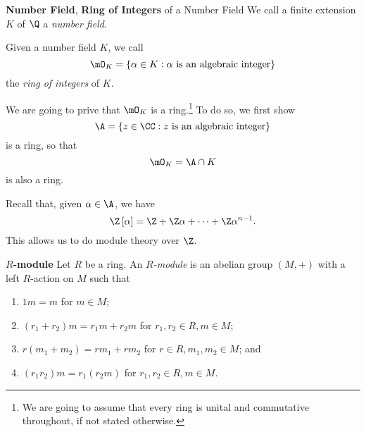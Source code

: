\documentclass[pmath441]{subfiles}
\begin{document}
    \begin{definition}{\textbf{Number Field}, \textbf{Ring of Integers} of a Number Field}
        We call a finite extension $K$ of $\Q$ a \emph{number field}.

        Given a number field $K$, we call
        \begin{equation*}
            \mO_K = \left\lbrace \alpha\in K: \alpha \text{ is an algebraic integer} \right\rbrace
        \end{equation*}
        the \emph{ring of integers} of $K$.
    \end{definition}
    
    \np We are going to prive that $\mO_K$ is a ring.\footnote{We are going to assume that every ring is unital and commutative throughout, if not stated otherwise.} To do so, we first show
    \begin{equation*}
        \A = \left\lbrace z\in\CC: z\text{ is an algebraic integer} \right\rbrace
    \end{equation*}
    is a ring, so that
    \begin{equation*}
        \mO_K = \A\cap K
    \end{equation*}
    is also a ring.
    
    \np Recall that, given $\alpha\in\A$, we have
    \begin{equation*}
        \Z\left[ \alpha \right] = \Z + \Z\alpha + \cdots + \Z\alpha^{n-1}.
    \end{equation*}
    This allows us to do module theory over $\Z$.

    \begin{definition}{\textbf{$R$-module}}
        Let $R$ be a ring. An \emph{$R$-module} is an abelian group $\left( M,+ \right)$ with a left $R$-action on $M$ such that
        \begin{enumerate}
            \item $1m = m$ for $m\in M$;
            \item $\left( r_1+r_2 \right)m = r_1m+r_2m$ for $r_1,r_2\in R, m\in M$;
            \item $r\left( m_1+m_2 \right) = rm_1+rm_2$ for $r\in R, m_1,m_2\in M$; and
            \item $\left( r_1r_2 \right)m = r_1\left( r_2m \right)$ for $r_1,r_2\in R, m\in M$.
        \end{enumerate}
    \end{definition}

    \clearpage
    
\end{document}
